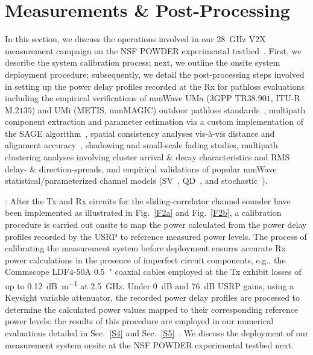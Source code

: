 \documentclass[10pt, twocolumn]{IEEEtran}
\begin{document}
\section{Measurements \& Post-Processing}\label{S3}
In this section, we discuss the operations involved in our \SI{28}{\giga\hertz} V$2$X measurement campaign on the NSF POWDER experimental testbed~\cite{POWDER}. First, we describe the system calibration process; next, we outline the onsite system deployment procedure; subsequently, we detail the post-processing steps involved in setting up the power delay profiles recorded at the Rx for pathloss evaluations including the empirical verifications of mmWave UMa ($3$GPP TR$38.901$, ITU-R M$.2135$) and UMi (METIS, mmMAGIC) outdoor pathloss standards~\cite{MacCartneyModelsOverview}, multipath component extraction and parameter estimation via a custom implementation of the SAGE algorithm~\cite{SAGE}, spatial consistency analyses vis-\`{a}-vis distance and alignment accuracy~\cite{SpatialConsistencyOriginal}, shadowing and small-scale fading studies, multipath clustering analyses involving cluster arrival \& decay characteristics and RMS delay- \& direction-spreads, and empirical validations of popular mmWave statistical/parameterized channel models (SV~\cite{SV_Molisch}, QD~\cite{QDC_NIST}, and stochastic~\cite{Indoor60G}).

: After the Tx and Rx circuits for the sliding-correlator channel sounder have been implemented as illustrated in Fig.~\ref{F2a} and Fig.~\ref{F2b}, a calibration procedure is carried out onsite to map the power calculated from the power delay profiles recorded by the USRP to reference measured power levels. The process of calibrating the measurement system before deployment ensures accurate Rx power calculations in the presence of imperfect circuit components, e.g., the Commscope LDF$4$-$50$A \SI{0.5}{{"}} coaxial cables employed at the Tx exhibit losses of up to \SI{0.12}{\deci\bel\per\meter} at \SI{2.5}{\giga\hertz}. Under \SI{0}{\deci\bel} and \SI{76}{\deci\bel} USRP gains, using a Keysight variable attenuator, the recorded power delay profiles are processed to determine the calculated power values mapped to their corresponding reference power levels: the results of this procedure are employed in our numerical evaluations detailed in Sec.~\ref{S4} and Sec.~\ref{S5}~\cite{SPAVE_ICC}. We discuss the deployment of our measurement system onsite at the NSF POWDER experimental testbed next.
\end{document}
